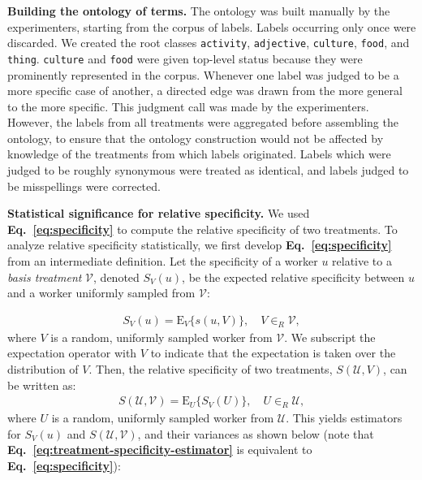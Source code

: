 \documentclass[a4paper]{report}
\begin{document}
\textbf{Building the ontology of terms.}  The ontology was built manually
by the experimenters, starting from the corpus of labels. Labels occurring only 
once were discarded.  We created the root classes \texttt{activity}, 
\texttt{adjective}, \texttt{culture}, 
\texttt{food}, and \texttt{thing}. \texttt{culture} and \texttt{food} were 
given top-level status because they were prominently represented in the corpus.
Whenever one label was judged to be a more specific case of another, a
directed edge was drawn from the more general to the more specific. This
judgment call was made by the experimenters.  However, the labels from all 
treatments were aggregated before assembling the ontology,  to 
ensure that the ontology construction would not be affected by 
knowledge of the treatments from which labels originated. 
Labels which were judged to be roughly synonymous were treated as identical,
and labels judged to be misspellings were corrected. 

\textbf{Statistical significance for relative specificity.}
We used \textbf{Eq.~\ref{eq:specificity}} to compute the relative specificity
of two treatments.  To analyze relative specificity statistically,
we first develop \textbf{Eq.~\ref{eq:specificity}} from an intermediate 
definition.  Let the specificity of a worker $u$ relative to a 
\textit{basis treatment} $\mathcal{V}$, denoted $S_V(u)$, be the expected 
relative specificity between $u$ and a worker uniformly sampled from 
$\mathcal{V}$:

\begin{align}
	S_V(u) =  \text{E}_V\{s(u,V)\}, \quad V \in_R \mathcal{V},
		\label{eq:basis-specificity}
\end{align}
where $V$ is a random, uniformly sampled worker from $\mathcal{V}$.  We 
subscript the expectation operator with $V$ to indicate 
that the expectation is taken over the distribution of $V$.  Then, the 
relative specificity of two treatments, $S(\mathcal{U},{V})$, can be 
written as:
\begin{align}
	S(\mathcal{U},\mathcal{V}) = 
		\text{E}_U\{S_V(U)\}, \quad U \in_R \mathcal{U},
		\label{eq:treatment-specificity}
\end{align}
where $U$ is a random, uniformly sampled worker from $\mathcal{U}$.  This 
yields 
estimators for $S_V(u)$ and $S(\mathcal{U}, \mathcal{V})$, and their variances
as shown below (note that 
\textbf{Eq.~\ref{eq:treatment-specificity-estimator}} is
equivalent to \textbf{Eq.~\ref{eq:specificity}}):
\end{document}
